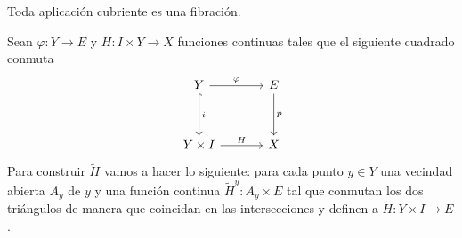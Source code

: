 \begin{teorema}
\label{teo:cubirente implica fibracion}
    Toda aplicación cubriente es una fibración.
\end{teorema}
\begin{dem}
    Sean $\varphi:Y\to E$ y $H:I\times Y\to X$ funciones continuas tales que el siguiente cuadrado conmuta
    \begin{equation*}
        \begin{tikzcd}[row sep=1.2cm, column sep=1.2cm]
            Y \arrow[r,"\varphi"] \arrow[hook,d, "i"] & E\arrow[d, "p"]\\
            Y\times I \arrow[r, "H"] & X
        \end{tikzcd}
    \end{equation*}
    Para construir $\widetilde{H}$ vamos a hacer lo siguiente: para cada punto $y\in Y$ una vecindad abierta $A_y$ de $y$ y una función continua $\widetilde{H}^y:A_y\times E$ tal que conmutan los dos triángulos de manera que coincidan en las intersecciones y definen a $\widetilde{H}:Y\times I\to E$.


\end{dem}
